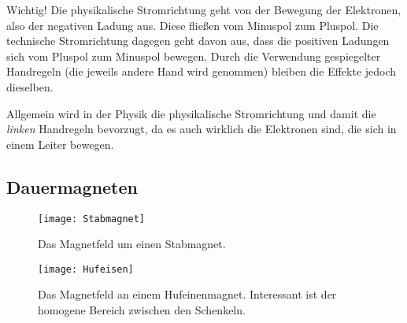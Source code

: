 \begin{leftbar}
	Wichtig! Die physikalische Stromrichtung geht von der Bewegung der Elektronen, also der negativen Ladung aus. Diese fließen vom Minuspol zum Pluspol. Die technische Stromrichtung dagegen geht davon aus, dass die positiven Ladungen sich vom Pluspol zum Minuspol bewegen. Durch die Verwendung gespiegelter Handregeln (die jeweils andere Hand wird genommen) bleiben die Effekte jedoch dieselben. 
	
	Allgemein wird in der Physik die physikalische Stromrichtung und damit die \emph{linken} Handregeln bevorzugt, da es auch wirklich die Elektronen sind, die sich in einem Leiter bewegen.
\end{leftbar}

\subsection{Dauermagneten}  	\label{subsec:DauermagnetFeld}


 \hfill

\begin{figure}[ht!]
	\centering
	\begin{minipage}[b]{0.4\linewidth}
    	\texttt{[image: Stabmagnet]}
		\caption{Das Magnetfeld um einen Stabmagnet.}
	\end{minipage}
	\quad
	\begin{minipage}[b]{0.4\linewidth}
    	\texttt{[image: Hufeisen]}
		\caption{Das Magnetfeld an einem Hufeinenmagnet. Interessant ist der homogene Bereich zwischen den Schenkeln.}
	\end{minipage}
\end{figure}


